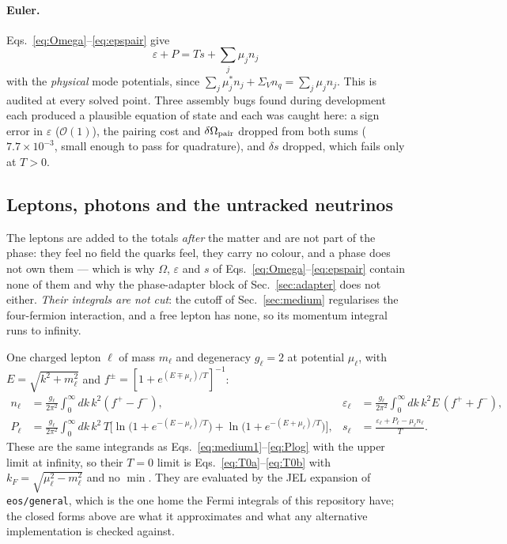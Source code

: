 \documentclass[aps,prc,onecolumn,superscriptaddress,nofootinbib,10pt]{revtex4-2}
\newcommand{\nq}{n_q}
\begin{document}
\paragraph{Euler.} Eqs.~\eqref{eq:Omega}--\eqref{eq:epspair} give
\begin{equation}
  \varepsilon + P = T s + \sum_j \mu_j n_j
  \label{eq:euler}
\end{equation}
with the \emph{physical} mode potentials, since
$\sum_j \mu^{*}_j n_j + \Sigma_V \nq = \sum_j \mu_j n_j$. This is audited at
every solved point. Three assembly bugs found during development each produced
a plausible equation of state and each was caught here: a sign error in
$\varepsilon$ ($\mathcal{O}(1)$), the pairing cost and $\delta\Omega_{\rm pair}$
dropped from both sums ($7.7\times10^{-3}$, small enough to pass for
quadrature), and $\delta s$ dropped, which fails only at $T>0$.

\subsection{Leptons, photons and the untracked neutrinos}
\label{sec:leptons}

The leptons are added to the totals \emph{after} the matter and are not part of
the phase: they feel no field the quarks feel, they carry no colour, and a
phase does not own them --- which is why $\Omega$, $\varepsilon$ and $s$ of
Eqs.~\eqref{eq:Omega}--\eqref{eq:epspair} contain none of them and why the
phase-adapter block of Sec.~\ref{sec:adapter} does not either. \emph{Their
integrals are not cut}: the cutoff of Sec.~\ref{sec:medium} regularises the
four-fermion interaction, and a free lepton has none, so its momentum integral
runs to infinity.

One charged lepton $\ell$ of mass $m_\ell$ and degeneracy $g_\ell = 2$ at
potential $\mu_\ell$, with $E = \sqrt{k^2+m_\ell^2}$ and
$f^{\pm} = [1+e^{(E \mp \mu_\ell)/T}]^{-1}$:
\begin{align}
  n_\ell &= \frac{g_\ell}{2\pi^2}\int_0^{\infty}\!\! dk\, k^2 (f^{+} - f^{-}) ,
  &
  \varepsilon_\ell &= \frac{g_\ell}{2\pi^2}\int_0^{\infty}\!\! dk\, k^2 E\,(f^{+}+f^{-}) ,
  \label{eq:lepton1}\\
  P_\ell &= \frac{g_\ell}{2\pi^2}\int_0^{\infty}\!\! dk\, k^2\, T
    \Big[\ln\!\big(1+e^{-(E-\mu_\ell)/T}\big)
       + \ln\!\big(1+e^{-(E+\mu_\ell)/T}\big)\Big] ,
  &
  s_\ell &= \frac{\varepsilon_\ell + P_\ell - \mu_\ell n_\ell}{T} .
  \label{eq:lepton2}
\end{align}
These are the same integrands as Eqs.~\eqref{eq:medium1}--\eqref{eq:Plog} with
the upper limit at infinity, so their $T=0$ limit is
Eqs.~\eqref{eq:T0a}--\eqref{eq:T0b} with $k_F = \sqrt{\mu_\ell^2 - m_\ell^2}$
and no $\min$. They are evaluated by the JEL expansion of
\texttt{eos/general}, which is the one home the Fermi integrals of this
repository have; the closed forms above are what it approximates and what any
alternative implementation is checked against.
\end{document}
